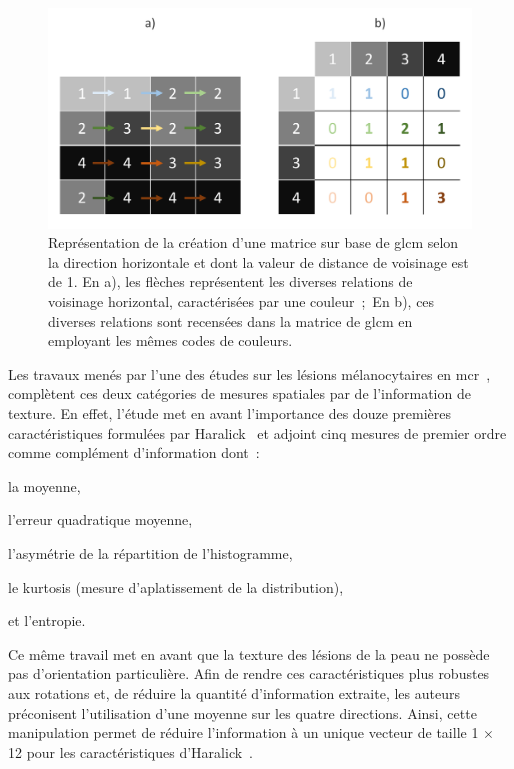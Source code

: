 \begin{figure}[H]
    \centering
    \includegraphics[width=\linewidth]{contents/chapter_5/resources/scheme_principle_GLCM.pdf}
    \caption{Représentation de la création d'une matrice sur base de \gls{glcm} selon la direction horizontale et dont la valeur de distance de voisinage est de 1. En a), les flèches représentent les diverses relations de voisinage horizontal, caractérisées par une couleur~;~En b), ces diverses relations sont recensées dans la matrice de \gls{glcm} en employant les mêmes codes de couleurs.}
    \label{fig:scheme_principle_GLCM}
\end{figure}\par

Les travaux menés par l'une des études sur les lésions mélanocytaires en \gls{mcr}~\cite{Wiltgen2008}, complètent ces deux catégories de mesures spatiales par de l'information de texture. En effet, l'étude met en avant l'importance des douze premières caractéristiques formulées par Haralick~\cite{Haralick1973} et adjoint cinq mesures de premier ordre comme complément d'information dont~:
\begin{inlinerate}
    \item la moyenne,
    \item l'erreur quadratique moyenne,
    \item l'asymétrie de la répartition de l'histogramme,
    \item le kurtosis (mesure d'aplatissement de la distribution),
    \item et l'entropie.
\end{inlinerate}
Ce même travail met en avant que la texture des lésions de la peau ne possède pas d'orientation particulière. Afin de rendre ces caractéristiques plus robustes aux rotations et, de réduire la quantité d'information extraite, les auteurs préconisent l'utilisation d'une moyenne sur les quatre directions. Ainsi, cette manipulation permet de réduire l'information à un unique vecteur de taille 1 $\times$ 12 pour les caractéristiques d'Haralick~.\par

